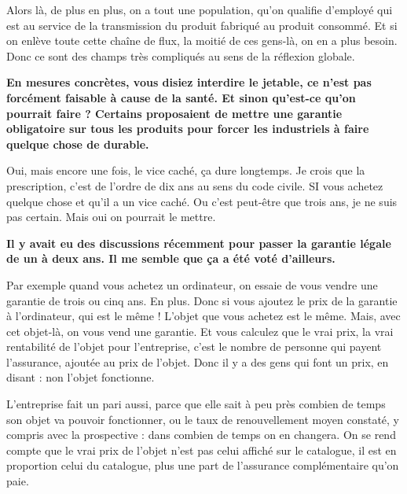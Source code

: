 \begin{small}
Alors là, de plus en plus, on a tout une population, qu'on qualifie d'employé qui est au service de la transmission du produit fabriqué au produit consommé. Et si on enlève toute cette chaîne de flux, la moitié de ces gens-là, on en a plus besoin. Donc ce sont des champs très compliqués au sens de la réflexion globale. 

\vspace{1\baselineskip}

\textbf{En mesures concrètes, vous disiez interdire le jetable, ce n'est pas forcément faisable à cause de la santé. Et sinon qu'est-ce qu'on pourrait faire ? Certains proposaient de mettre une garantie obligatoire sur tous les produits pour forcer les industriels à faire quelque chose de durable.}

\vspace{1\baselineskip}

Oui, mais encore une fois, le vice caché, ça dure longtemps. Je crois que la prescription, c'est de l'ordre de dix ans au sens du code civile. SI vous achetez quelque chose et qu'il a un vice caché. Ou c'est peut-être que trois ans, je ne suis pas certain. Mais oui on pourrait le mettre.

\vspace{1\baselineskip}

\textbf{Il y avait eu des discussions récemment pour passer la garantie légale de un à deux ans. Il me semble que ça a été voté d'ailleurs.}

\vspace{1\baselineskip}

Par exemple quand vous achetez un ordinateur, on essaie de vous vendre une garantie de trois ou cinq ans. En plus. Donc si vous ajoutez le prix de la garantie à l'ordinateur, qui est le même ! L'objet que vous achetez est le même. Mais, avec cet objet-là, on vous vend une garantie. Et vous calculez que le vrai prix, la vrai rentabilité de l'objet pour l'entreprise, c'est le nombre de personne qui payent l'assurance, ajoutée au prix de l'objet. Donc il y a des gens qui font un prix, en disant : non l'objet fonctionne. 

L'entreprise fait un pari aussi, parce que elle sait à peu près combien de temps son objet va pouvoir fonctionner, ou le taux de renouvellement moyen constaté, y compris avec la prospective : dans combien de temps on en changera. On se rend compte que le vrai prix de l'objet n'est pas celui affiché sur le catalogue, il est en proportion celui du catalogue, plus une part de l'assurance complémentaire qu'on paie. 


\end{small}
